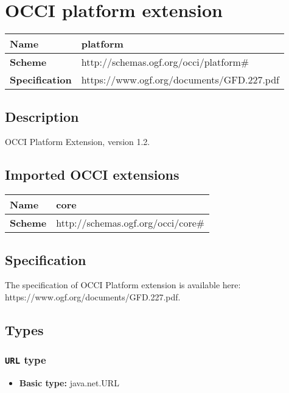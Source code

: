 \section{OCCI platform extension}
\begin{center}
\begin{tabular}{|l|l|}
  \hline
  \textbf{Name} & platform \\
  \hline  
  \textbf{Scheme} & http://schemas.ogf.org/occi/platform\# \\
  \hline
  \textbf{Specification} & https://www.ogf.org/documents/GFD.227.pdf \\
  \hline
\end{tabular}
\end{center}

\subsection{Description}
OCCI Platform Extension, version 1.2.
\subsection{Imported OCCI extensions}

\begin{center} 
\begin{tabular}{|l|l|}
  \hline
  \textbf{Name} & core \\
  \hline  
  \textbf{Scheme} & http://schemas.ogf.org/occi/core\# \\
  \hline
\end{tabular}
\end{center}


\subsection{Specification}
The specification of OCCI Platform extension is available here: https://www.ogf.org/documents/GFD.227.pdf.
\subsection{Types}
\subsubsection{\texttt{URL} type}

\begin{itemize}
\item \textbf{Basic type:} java.net.URL
\end{itemize}
